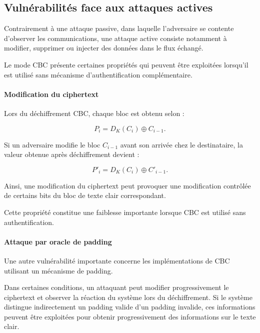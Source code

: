 \documentclass[12pt,a4paper]{article}
\begin{document}
\subsection{Vulnérabilités face aux attaques actives}

Contrairement à une attaque passive, dans laquelle l'adversaire se
contente d'observer les communications, une attaque active consiste
notamment à modifier, supprimer ou injecter des données dans le flux
échangé.

Le mode CBC présente certaines propriétés qui peuvent être exploitées
lorsqu'il est utilisé sans mécanisme d'authentification
complémentaire.


\paragraph{Modification du ciphertext}

Lors du déchiffrement CBC, chaque bloc est obtenu selon :

\[
P_i = D_K(C_i) \oplus C_{i-1}.
\]

Si un adversaire modifie le bloc $C_{i-1}$ avant son arrivée chez le
destinataire, la valeur obtenue après déchiffrement devient :

\[
P'_i = D_K(C_i) \oplus C'_{i-1}.
\]

Ainsi, une modification du ciphertext peut provoquer une modification
contrôlée de certains bits du bloc de texte clair correspondant.

Cette propriété constitue une faiblesse importante lorsque CBC est
utilisé sans authentification.


\paragraph{Attaque par oracle de padding}

Une autre vulnérabilité importante concerne les implémentations de CBC
utilisant un mécanisme de padding.

Dans certaines conditions, un attaquant peut modifier progressivement
le ciphertext et observer la réaction du système lors du
déchiffrement. Si le système distingue indirectement un padding valide
d'un padding invalide, ces informations peuvent être exploitées pour
obtenir progressivement des informations sur le texte clair.
\end{document}
